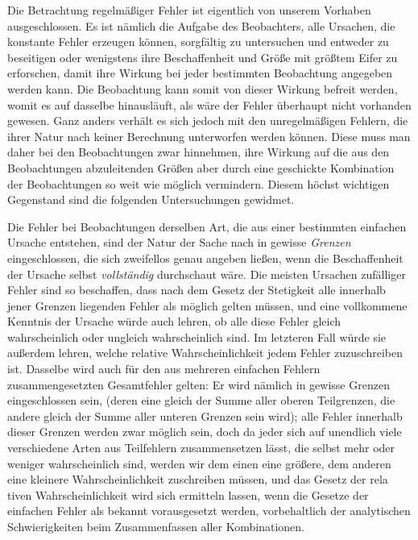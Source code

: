 Die Betrachtung regelmäßiger Fehler ist eigentlich von unserem Vorhaben ausgeschlossen. Es ist nämlich die Aufgabe des Beobachters, alle Ursachen, die konstante Fehler erzeugen können, sorgfältig zu untersuchen und entweder zu beseitigen oder wenigstens ihre Beschaffenheit und Größe mit größtem Eifer zu erforschen, damit ihre Wirkung bei jeder bestimmten Beobachtung angegeben werden kann. Die Beobachtung kann somit von dieser Wirkung befreit werden, womit es auf dasselbe hinausläuft, als wäre der Fehler überhaupt nicht vorhanden gewesen. Ganz anders verhält es sich jedoch mit den unregelmäßigen Fehlern, die ihrer Natur nach keiner Berechnung unterworfen werden können. Diese muss man daher bei den Beobachtungen zwar hinnehmen, ihre Wirkung auf die aus den Beobachtungen abzuleitenden Größen aber durch eine geschickte Kombination der Beobachtungen so weit wie möglich vermindern. Diesem höchst wichtigen Gegenstand sind die folgenden Untersuchungen gewidmet.

Die Fehler bei Beobachtungen derselben Art, die aus einer bestimmten einfachen Ursache entstehen, sind der Natur der Sache nach in gewisse \textit{Grenzen} eingeschlossen, die sich zweifellos genau angeben ließen, wenn die Beschaffenheit der Ursache selbst \textit{vollständig} durchschaut wäre. Die meisten Ursachen zufälliger Fehler sind so beschaffen, dass nach dem Gesetz der Stetigkeit alle innerhalb jener Grenzen liegenden Fehler als möglich gelten müssen, und eine vollkommene Kenntnis der Ursache würde auch lehren, ob alle diese Fehler gleich wahrscheinlich oder ungleich wahrscheinlich sind. Im letzteren Fall würde sie außerdem lehren, welche relative Wahrscheinlichkeit jedem Fehler zuzuschreiben ist. Dasselbe wird auch für den aus mehreren einfachen Fehlern zusammengesetzten Gesamtfehler gelten: Er wird nämlich in gewisse Grenzen eingeschlossen sein, (deren eine gleich der Summe aller oberen Teilgrenzen, die andere gleich der Summe aller unteren Grenzen sein wird); alle Fehler innerhalb dieser Grenzen werden zwar möglich sein, doch da jeder sich auf unendlich viele verschiedene Arten aus Teilfehlern zusammensetzen lässt, die selbst mehr oder weniger wahrscheinlich sind, werden wir dem einen eine größere, dem anderen eine kleinere Wahrscheinlichkeit zuschreiben müssen, und das Gesetz der rela%
tiven Wahrscheinlichkeit wird sich ermitteln lassen, wenn die Gesetze der einfachen Fehler als bekannt vorausgesetzt werden, vorbehaltlich der analytischen Schwierigkeiten beim Zusammenfassen aller Kombinationen.

